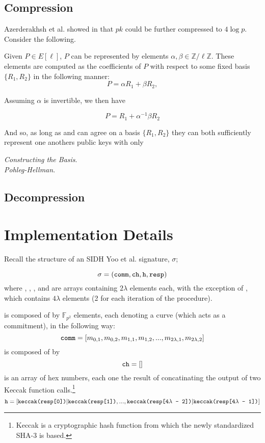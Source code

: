 \subsection{Compression}

Azerderakhsh et al. showed in \cite{compwr} that $pk$ could be further compressed to $4\log p$. Consider the following.

Given $P \in E[\ell]$, $P$ can be represented by elements $\alpha, \beta \in \mathbb{Z}/\ell\mathbb{Z}$. These elements are computed as the coefficients of $P$ with respect to some fixed basis $\{R_1, R_2\}$ in the following manner: 
$$
P = \alpha R_1 + \beta R_2,
$$

Assuming $\alpha$ is invertible, we then have

$$
P = R_1 + \alpha^{-1}\beta R_2
$$

And so, as long as \alice and \bob can agree on a basis $\{R_1, R_2\}$ they can both sufficiently represent one anothers public keys with only 

\noindent
\textit{Constructing the Basis}.\\

\noindent
\textit{Pohleg-Hellman}.

\subsection{Decompression}

\section{Implementation Details}
\label{sec:compimplementation}

Recall the structure of an SIDH Yoo et al. signature, $\sigma$;

$$
\sigma = (\texttt{comm}, \texttt{ch}, \texttt{h}, \texttt{resp})
$$
where , , , and  are arrays containing $2\lambda$ elements each, with the exception of , which contains $4\lambda$ elements (2 for each iteration of the procedure).

 is composed of by $\mathbb{F}_{p^2}$ elements, each denoting a curve (which acts as a commitment), in the following way:
$$
\texttt{comm} = [m_{0, 1}, m_{0, 2}, m_{1, 1}, m_{1, 2}, ... , m_{2\lambda, 1}, m_{2\lambda, 2}]
$$
 is composed of by
$$
\texttt{ch} = []
$$
 is an array of hex numbers, each one the result of concatinating the output of two Keccak function calls.\footnote{Keccak is a cryptographic hash function from which the newly standardized SHA-3 is based.} 
$$
\texttt{h} = [\texttt{keccak(resp[0])}|\texttt{keccak(resp[1])}, ... , \texttt{keccak(resp[4}\lambda\texttt{ - 2])}|\texttt{keccak(resp[4}\lambda\texttt{ - 1])}]
$$

